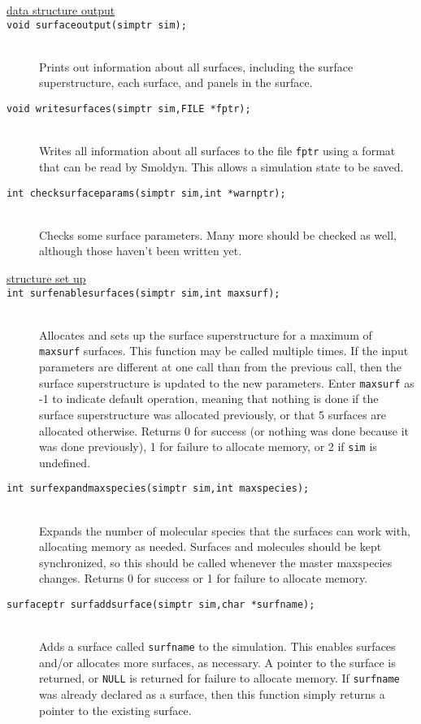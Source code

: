 \documentclass {book}
\newcommand {\ttt} {\texttt}
\begin{document}
\begin{description}
\item[\underline{data structure output}]

\item[\ttt{void surfaceoutput(simptr sim);}]
\hfill \\
Prints out information about all surfaces, including the surface superstructure, each surface, and panels in the surface.

\item[\ttt{void writesurfaces(simptr sim,FILE *fptr);}]
\hfill \\
Writes all information about all surfaces to the file \ttt{fptr} using a format that can be read by Smoldyn. This allows a simulation state to be saved.

\item[\ttt{int checksurfaceparams(simptr sim,int *warnptr);}]
\hfill \\
Checks some surface parameters. Many more should be checked as well, although those haven't been written yet.

\item[\underline{structure set up}]

\item[\ttt{int surfenablesurfaces(simptr sim,int maxsurf);}]
\hfill \\
Allocates and sets up the surface superstructure for a maximum of \ttt{maxsurf} surfaces. This function may be called multiple times. If the input parameters are different at one call than from the previous call, then the surface superstructure is updated to the new parameters. Enter \ttt{maxsurf} as -1 to indicate default operation, meaning that nothing is done if the surface superstructure was allocated previously, or that 5 surfaces are allocated otherwise. Returns 0 for success (or nothing was done because it was done previously), 1 for failure to allocate memory, or 2 if \ttt{sim} is undefined.

\item[\ttt{int surfexpandmaxspecies(simptr sim,int maxspecies);}]
\hfill \\
Expands the number of molecular species that the surfaces can work with, allocating memory as needed. Surfaces and molecules should be kept synchronized, so this should be called whenever the master maxspecies changes. Returns 0 for success or 1 for failure to allocate memory.

\item[\ttt{surfaceptr surfaddsurface(simptr sim,char *surfname);}]
\hfill \\
Adds a surface called \ttt{surfname} to the simulation. This enables surfaces and/or allocates more surfaces, as necessary. A pointer to the surface is returned, or \ttt{NULL} is returned for failure to allocate memory. If \ttt{surfname} was already declared as a surface, then this function simply returns a pointer to the existing surface.


\end{description}
\end{document}
